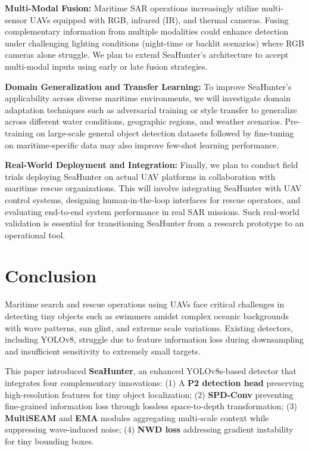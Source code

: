 \documentclass[lettersize,journal]{IEEEtran}
\begin{document}
\textbf{Multi-Modal Fusion:} Maritime SAR operations increasingly utilize multi-sensor UAVs equipped with RGB, infrared (IR), and thermal cameras. Fusing complementary information from multiple modalities could enhance detection under challenging lighting conditions (night-time or backlit scenarios) where RGB cameras alone struggle. We plan to extend SeaHunter's architecture to accept multi-modal inputs using early or late fusion strategies.

\textbf{Domain Generalization and Transfer Learning:} To improve SeaHunter's applicability across diverse maritime environments, we will investigate domain adaptation techniques such as adversarial training or style transfer to generalize across different water conditions, geographic regions, and weather scenarios. Pre-training on large-scale general object detection datasets followed by fine-tuning on maritime-specific data may also improve few-shot learning performance.

\textbf{Real-World Deployment and Integration:} Finally, we plan to conduct field trials deploying SeaHunter on actual UAV platforms in collaboration with maritime rescue organizations. This will involve integrating SeaHunter with UAV control systems, designing human-in-the-loop interfaces for rescue operators, and evaluating end-to-end system performance in real SAR missions. Such real-world validation is essential for transitioning SeaHunter from a research prototype to an operational tool.

\section{Conclusion}
\label{sec:conclusion}

Maritime search and rescue operations using UAVs face critical challenges in detecting tiny objects such as swimmers amidst complex oceanic backgrounds with wave patterns, sun glint, and extreme scale variations. Existing detectors, including YOLOv8, struggle due to feature information loss during downsampling and insufficient sensitivity to extremely small targets.

This paper introduced \textbf{SeaHunter}, an enhanced YOLOv8s-based detector that integrates four complementary innovations: (1) A \textbf{P2 detection head} preserving high-resolution features for tiny object localization; (2) \textbf{SPD-Conv} preventing fine-grained information loss through lossless space-to-depth transformation; (3) \textbf{MultiSEAM} and \textbf{EMA} modules aggregating multi-scale context while suppressing wave-induced noise; (4) \textbf{NWD loss} addressing gradient instability for tiny bounding boxes.
\end{document}
